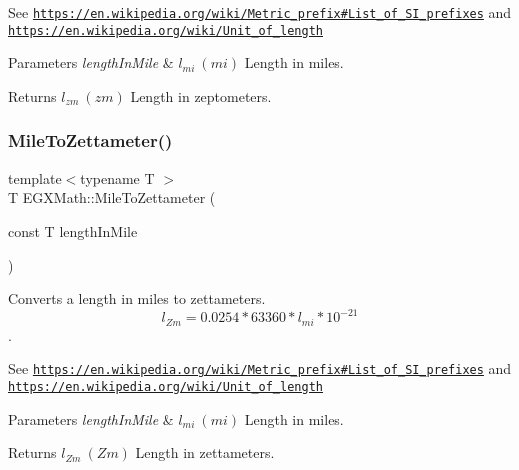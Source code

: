 See \href{https://en.wikipedia.org/wiki/Metric_prefix#List_of_SI_prefixes}{\tt https\+://en.\+wikipedia.\+org/wiki/\+Metric\+\_\+prefix\#\+List\+\_\+of\+\_\+\+S\+I\+\_\+prefixes} and \href{https://en.wikipedia.org/wiki/Unit_of_length}{\tt https\+://en.\+wikipedia.\+org/wiki/\+Unit\+\_\+of\+\_\+length} 
\begin{DoxyParams}{Parameters}
{\em length\+In\+Mile} & $ l_{mi}\ (mi)$ Length in miles. \\
\hline
\end{DoxyParams}
\begin{DoxyReturn}{Returns}
$ l_{zm}\ (zm)$ Length in zeptometers. 
\end{DoxyReturn}
\mbox{\label{group___e_g_x_math-_conversions-_length_conversions-_imperial-_mile-_s_i_ga21202d0625220f09f6f49370f2226054}} 
\subsubsection{\texorpdfstring{Mile\+To\+Zettameter()}{MileToZettameter()}}
{\footnotesize\ttfamily template$<$typename T $>$ \\
T E\+G\+X\+Math\+::\+Mile\+To\+Zettameter (\begin{DoxyParamCaption}\item[{const T}]{length\+In\+Mile }\end{DoxyParamCaption})}



Converts a length in miles to zettameters. \[ l_{Zm}=0.0254 * 63360 * l_{mi} * 10^{-21} \]. 

See \href{https://en.wikipedia.org/wiki/Metric_prefix#List_of_SI_prefixes}{\tt https\+://en.\+wikipedia.\+org/wiki/\+Metric\+\_\+prefix\#\+List\+\_\+of\+\_\+\+S\+I\+\_\+prefixes} and \href{https://en.wikipedia.org/wiki/Unit_of_length}{\tt https\+://en.\+wikipedia.\+org/wiki/\+Unit\+\_\+of\+\_\+length} 
\begin{DoxyParams}{Parameters}
{\em length\+In\+Mile} & $ l_{mi}\ (mi)$ Length in miles. \\
\hline
\end{DoxyParams}
\begin{DoxyReturn}{Returns}
$ l_{Zm}\ (Zm)$ Length in zettameters. 
\end{DoxyReturn}

